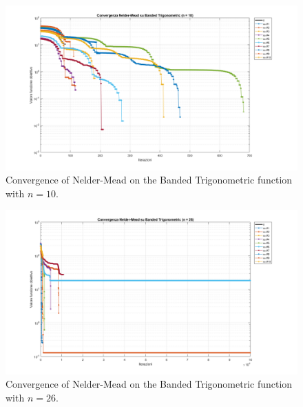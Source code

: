 \documentclass[a4paper,12pt]{article}
\begin{document}
	\begin{table}[H]
		\centering
		\caption{Results of Nelder–Mead on Banded Trigonometric function.}
		\renewcommand{\arraystretch}{1.2}
		\label{tab:nelder_banded}
	\end{table}
	\newpage
	\begin{figure}[H]
		\centering
		\includegraphics[width=\textwidth]{../immagini/banded_10.png}
		\caption{Convergence of Nelder-Mead on the Banded Trigonometric function with $n = 10$.}
		\label{fig:bt_nelder_10}
	\end{figure}
	
	\begin{figure}[htbp]
		\centering
		\includegraphics[width=\textwidth]{../immagini/banded_26.png}
		\caption{Convergence of Nelder-Mead on the Banded Trigonometric function with $n = 26$.}
		\label{fig:bt_nelder_26}
	\end{figure}
	
\end{document}
